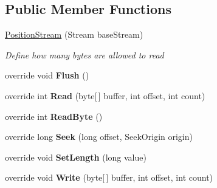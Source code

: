 \subsection*{Public Member Functions}
\begin{DoxyCompactItemize}
\item 
\hyperlink{class_silent_orbit_1_1_protocol_buffers_1_1_position_stream_ab13f95fb3f0983f82388afb9bb1c013c}{Position\+Stream} (Stream base\+Stream)
\begin{DoxyCompactList}\small\item\em Define how many bytes are allowed to read \end{DoxyCompactList}\item 
\hypertarget{class_silent_orbit_1_1_protocol_buffers_1_1_position_stream_a6d7ebc2f64c2ca0082999b789e212b34}{}override void {\bfseries Flush} ()\label{class_silent_orbit_1_1_protocol_buffers_1_1_position_stream_a6d7ebc2f64c2ca0082999b789e212b34}

\item 
\hypertarget{class_silent_orbit_1_1_protocol_buffers_1_1_position_stream_a27fc475b69fe19b99f006e60b7014dad}{}override int {\bfseries Read} (byte\mbox{[}$\,$\mbox{]} buffer, int offset, int count)\label{class_silent_orbit_1_1_protocol_buffers_1_1_position_stream_a27fc475b69fe19b99f006e60b7014dad}

\item 
\hypertarget{class_silent_orbit_1_1_protocol_buffers_1_1_position_stream_aea646d55f92a44b21539362b8aa10a1e}{}override int {\bfseries Read\+Byte} ()\label{class_silent_orbit_1_1_protocol_buffers_1_1_position_stream_aea646d55f92a44b21539362b8aa10a1e}

\item 
\hypertarget{class_silent_orbit_1_1_protocol_buffers_1_1_position_stream_abf4fc317b09470675d7590be0006c60c}{}override long {\bfseries Seek} (long offset, Seek\+Origin origin)\label{class_silent_orbit_1_1_protocol_buffers_1_1_position_stream_abf4fc317b09470675d7590be0006c60c}

\item 
\hypertarget{class_silent_orbit_1_1_protocol_buffers_1_1_position_stream_a1426c80a536ff433af9000a9b230fe88}{}override void {\bfseries Set\+Length} (long value)\label{class_silent_orbit_1_1_protocol_buffers_1_1_position_stream_a1426c80a536ff433af9000a9b230fe88}

\item 
\hypertarget{class_silent_orbit_1_1_protocol_buffers_1_1_position_stream_a8d3b71fb0c9d731b928ca1d597fdbd97}{}override void {\bfseries Write} (byte\mbox{[}$\,$\mbox{]} buffer, int offset, int count)\label{class_silent_orbit_1_1_protocol_buffers_1_1_position_stream_a8d3b71fb0c9d731b928ca1d597fdbd97}


\end{DoxyCompactItemize}
